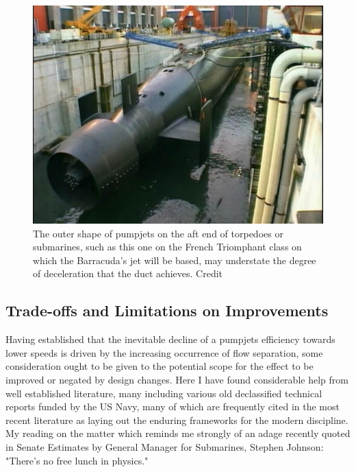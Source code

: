 \documentclass{article}\usepackage[]{graphicx}\usepackage[]{color}
\begin{document}
\begin{figure}
\includegraphics[width=\textwidth]{Triomph.jpg}
\caption{The outer shape of pumpjets on the aft end of torpedoes or submarines, such as this one on the French Triomphant class on which the Barracuda's jet will be based, may understate the degree of deceleration that the duct achieves. Credit \cite{reddit2016}}
\label{fig:Triomph.jpg}
\end{figure}

\subsection{Trade-offs and Limitations on Improvements}

Having established that the inevitable decline of a pumpjets efficiency towards lower speeds is driven by the increasing occurrence of flow separation, some consideration ought to be given to the potential scope for the effect to be improved or negated by design changes.  Here I have found considerable help from well established literature, many including various old declassified technical reports funded by the US Navy, many of which are frequently cited in the most recent literature as laying out the enduring frameworks for the modern discipline.  My reading on the matter which reminds me strongly of an adage recently quoted in Senate Estimates by General Manager for Submarines, Stephen Johnson: "There's no free lunch in physics."
\end{document}
